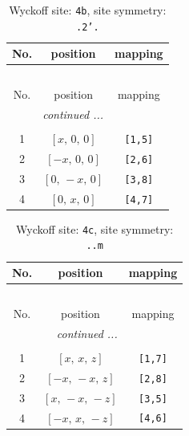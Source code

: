 \documentclass[fleqn,8pt]{jsarticle}
\begin{document}
\begin{longtable}{ccc}
\caption{Wyckoff site: {\tt 4b}, site symmetry: {\tt .2'.}}
 \\
 \hline \hline
No. & position & mapping \\ \hline \endfirsthead

\multicolumn{2}{l}{\tablename\ \thetable{}} \\
 \hline \hline
No. & position & mapping \\ \hline \endhead

 \hline \hline
\multicolumn{2}{r}{\footnotesize\it continued ...} \\ \endfoot

 \hline \hline
\multicolumn{2}{r}{} \\ \endlastfoot

1 & $\left[ x,\, 0,\, 0 \right]$ & {\tt [1,5]} \\ \hline
2 & $\left[ - x,\, 0,\, 0 \right]$ & {\tt [2,6]} \\ \hline
3 & $\left[ 0,\, - x,\, 0 \right]$ & {\tt [3,8]} \\ \hline
4 & $\left[ 0,\, x,\, 0 \right]$ & {\tt [4,7]} \\
\end{longtable}
\renewcommand{\arraystretch}{1.2}
\begin{longtable}{ccc}
\caption{Wyckoff site: {\tt 4c}, site symmetry: {\tt ..m}}
 \\
 \hline \hline
No. & position & mapping \\ \hline \endfirsthead

\multicolumn{2}{l}{\tablename\ \thetable{}} \\
 \hline \hline
No. & position & mapping \\ \hline \endhead

 \hline \hline
\multicolumn{2}{r}{\footnotesize\it continued ...} \\ \endfoot

 \hline \hline
\multicolumn{2}{r}{} \\ \endlastfoot

1 & $\left[ x,\, x,\, z \right]$ & {\tt [1,7]} \\ \hline
2 & $\left[ - x,\, - x,\, z \right]$ & {\tt [2,8]} \\ \hline
3 & $\left[ x,\, - x,\, - z \right]$ & {\tt [3,5]} \\ \hline
4 & $\left[ - x,\, x,\, - z \right]$ & {\tt [4,6]} \\
\end{longtable}
\renewcommand{\arraystretch}{1.2}
\end{document}
